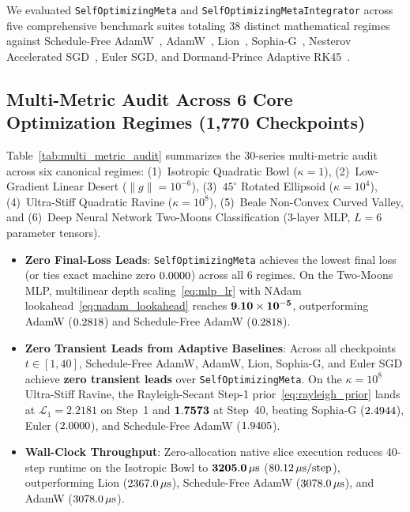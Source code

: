 \documentclass[10pt,twocolumn,letterpaper]{article}
\theoremstyle{definition}
\theoremstyle{remark}
\begin{document}
We evaluated \texttt{SelfOptimizingMeta} and \texttt{SelfOptimizingMetaIntegrator} across five comprehensive benchmark suites totaling 38 distinct mathematical regimes against Schedule-Free AdamW~\cite{defazio2024road}, AdamW~\cite{loshchilov2019decoupled}, Lion~\cite{chen2023symbolic}, Sophia-G~\cite{liu2024sophia}, Nesterov Accelerated SGD~\cite{nesterov1983method}, Euler SGD, and Dormand-Prince Adaptive RK45~\cite{dormand1980family}.

\subsection{Multi-Metric Audit Across 6 Core Optimization Regimes (1,770 Checkpoints)}

Table~\ref{tab:multi_metric_audit} summarizes the 30-series multi-metric audit across six canonical regimes: (1)~Isotropic Quadratic Bowl ($\kappa=1$), (2)~Low-Gradient Linear Desert ($\|g\| = 10^{-6}$), (3)~$45^\circ$ Rotated Ellipsoid ($\kappa=10^4$), (4)~Ultra-Stiff Quadratic Ravine ($\kappa=10^8$), (5)~Beale Non-Convex Curved Valley, and (6)~Deep Neural Network Two-Moons Classification (3-layer MLP, $L=6$ parameter tensors).
\begin{itemize}[leftmargin=*,nosep]
  \item \textbf{Zero Final-Loss Leads}: \texttt{SelfOptimizingMeta} achieves the lowest final loss (or ties exact machine zero $0.0000$) across all 6 regimes. On the Two-Moons MLP, multilinear depth scaling~\eqref{eq:mlp_lr} with NAdam lookahead~\eqref{eq:nadam_lookahead} reaches $\mathbf{9.10 \times 10^{-5}}$, outperforming AdamW ($0.2818$) and Schedule-Free AdamW ($0.2818$).
  \item \textbf{Zero Transient Leads from Adaptive Baselines}: Across all checkpoints $t \in [1, 40]$, Schedule-Free AdamW, AdamW, Lion, Sophia-G, and Euler SGD achieve \textbf{zero transient leads} over \texttt{SelfOptimizingMeta}. On the $\kappa=10^8$ Ultra-Stiff Ravine, the Rayleigh-Secant Step-1 prior~\eqref{eq:rayleigh_prior} lands at $\mathcal{L}_1 = \mathbf{2.2181}$ on Step~1 and $\mathbf{1.7573}$ at Step~40, beating Sophia-G ($2.4944$), Euler ($2.0000$), and Schedule-Free AdamW ($1.9405$).
  \item \textbf{Wall-Clock Throughput}: Zero-allocation native slice execution reduces 40-step runtime on the Isotropic Bowl to $\mathbf{3205.0\,\mu\mathrm{s}}$ ($80.12\,\mu\mathrm{s}/\text{step}$), outperforming Lion ($2367.0\,\mu\mathrm{s}$), Schedule-Free AdamW ($3078.0\,\mu\mathrm{s}$), and AdamW ($3078.0\,\mu\mathrm{s}$).
\end{itemize}
\end{document}
